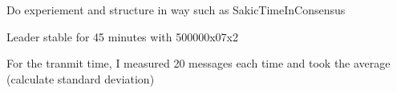 
Do experiement and structure in way such as SakicTimeInConsensus

Leader stable for 45 minutes with 500000x07x2

For the tranmit time, I measured 20 messages each time and took the average (calculate standard deviation)
\fi
